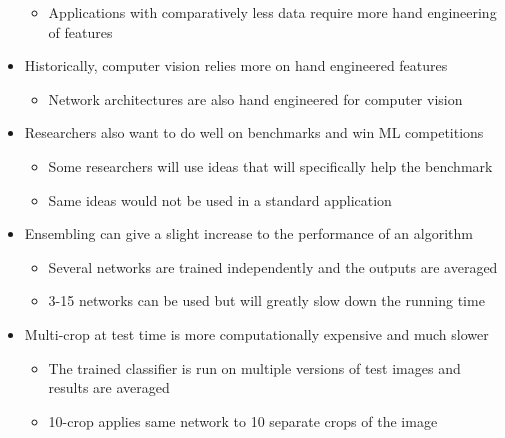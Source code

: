 \documentclass[12pt, letterpaper]{article}
\begin{document}
\begin{itemize}
\begin{itemize}
            \item Applications with comparatively less data require more hand engineering of features 
        \end{itemize}
        \item Historically, computer vision relies more on hand engineered features
        \begin{itemize}
            \item Network architectures are also hand engineered for computer vision
        \end{itemize}
        \item Researchers also want to do well on benchmarks and win ML competitions
        \begin{itemize}
            \item Some researchers will use ideas that will specifically help the benchmark
            \item Same ideas would not be used in a standard application 
        \end{itemize}
        \item Ensembling can give a slight increase to the performance of an algorithm
        \begin{itemize}
            \item Several networks are trained independently and the outputs are averaged
            \item 3-15 networks can be used but will greatly slow down the running time
        \end{itemize}
        \item Multi-crop at test time is more computationally expensive and much slower
        \begin{itemize}
            \item The trained classifier is run on multiple versions of test images and results are averaged
            \item 10-crop applies same network to 10 separate crops of the image
        \end{itemize}
    \end{itemize}
\end{document}
